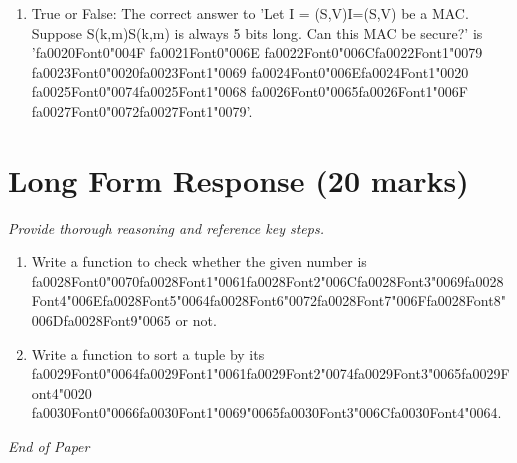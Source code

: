 \documentclass[12pt]{article}
\begin{document}
\begin{enumerate}[label=\arabic*.]
\item True or False: The correct answer to 'Let I = (S,V)I=(S,V) be a MAC. Suppose S(k,m)S(k,m) is always 5 bits long. Can this MAC be secure?' is '{\csname fa0020Font0\endcsname\char"004F} {\csname fa0021Font0\endcsname\char"006E} {\csname fa0022Font0\endcsname\char"006C}{\csname fa0022Font1\endcsname\char"0079} {\csname fa0023Font0\endcsname\char"0020}{\csname fa0023Font1\endcsname\char"0069} {\csname fa0024Font0\endcsname\char"006E}{\csname fa0024Font1\endcsname\char"0020} {\csname fa0025Font0\endcsname\char"0074}{\csname fa0025Font1\endcsname\char"0068} {\csname fa0026Font0\endcsname\char"0065}{\csname fa0026Font1\endcsname\char"006F} {\csname fa0027Font0\endcsname\char"0072}{\csname fa0027Font1\endcsname\char"0079}'.
\end{enumerate}

\section*{Long Form Response (20 marks)}
\textit{Provide thorough reasoning and reference key steps.}
\begin{enumerate}[label=\arabic*.]
\item Write a function to check whether the given number is {\csname fa0028Font0\endcsname\char"0070}{\csname fa0028Font1\endcsname\char"0061}{\csname fa0028Font2\endcsname\char"006C}{\csname fa0028Font3\endcsname\char"0069}{\csname fa0028Font4\endcsname\char"006E}{\csname fa0028Font5\endcsname\char"0064}{\csname fa0028Font6\endcsname\char"0072}{\csname fa0028Font7\endcsname\char"006F}{\csname fa0028Font8\endcsname\char"006D}{\csname fa0028Font9\endcsname\char"0065} or not.
\item Write a function to sort a tuple by its {\csname fa0029Font0\endcsname\char"0064}{\csname fa0029Font1\endcsname\char"0061}{\csname fa0029Font2\endcsname\char"0074}{\csname fa0029Font3\endcsname\char"0065}{\csname fa0029Font4\endcsname\char"0020} {\csname fa0030Font0\endcsname\char"0066}{\csname fa0030Font1\endcsname\char"0069}{\char"0065}{\csname fa0030Font3\endcsname\char"006C}{\csname fa0030Font4\endcsname\char"0064}.
\end{enumerate}

\vfill
\noindent\textit{End of Paper}
\end{document}
